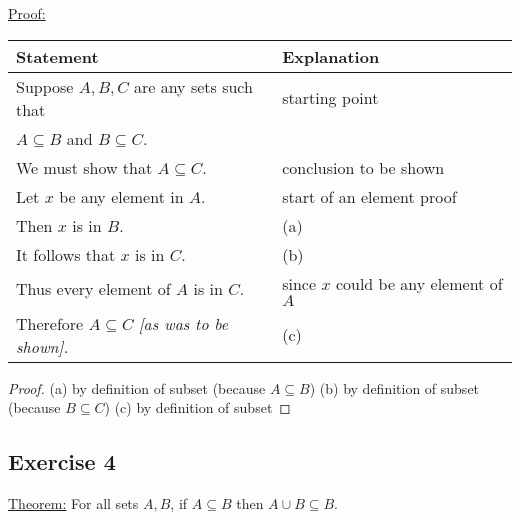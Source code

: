 \documentclass[14pt]{extarticle}
\newcommand{\fbl}{\underline{\hspace{1cm}}\,\,}
\newcommand{\cy}{\color{cyan}}
\begin{document}
\underline{Proof:}
\begin{center}
  \begin{tabular}{|l|l|}
    \hline
    {\bf Statement}                                         & {\bf Explanation}                     \\
    \hline
    Suppose $A, B, C$ are any sets such that                & starting point                        \\
    \(A \subseteq B\) and \(B \subseteq C\).                &                                       \\
    \hline
    We must show that \(A \subseteq C\).                    & conclusion to be shown                \\
    \hline
    Let $x$ be any element in $A$.                          & start of an element proof             \\
    \hline
    Then $x$ is in $B$.                                     & {\cy (a)} \fbl                        \\
    \hline
    It follows that $x$ is in $C$.                          & {\cy (b)} \fbl                        \\
    \hline
    Thus every element of $A$ is in $C$.                    & since $x$ could be any element of $A$ \\
    \hline
    Therefore \(A \subseteq C\) {\it [as was to be shown].} & {\cy (c)} \fbl                        \\
    \hline
  \end{tabular}
\end{center}

\begin{proof}
  (a) by definition of subset (because $A \subseteq B$) (b) by definition of subset (because $B \subseteq C$)
  (c) by definition of subset
\end{proof}

\subsection{Exercise 4}
\underline{Theorem:} For all sets $A, B$, if \(A \subseteq B\) then \(A \cup B \subseteq B\).
\end{document}
